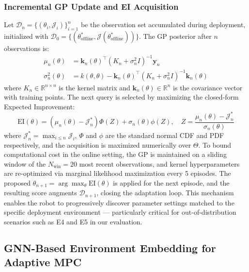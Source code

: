 \documentclass[conference]{IEEEtran}
\begin{document}
\subsubsection{Incremental GP Update and EI Acquisition}

Let $\mathcal{D}_n = \{(\theta_i, \mathcal{J}_i)\}_{i=1}^n$ be the observation set accumulated during deployment, initialized with $\mathcal{D}_0 = \{(\theta^*_{\text{offline}}, \mathcal{J}(\theta^*_{\text{offline}}))\}$. The GP posterior after $n$ observations is:
\begin{align}
	\mu_n(\theta)      & = \mathbf{k}_n(\theta)^\top (K_n + \sigma_n^2 I)^{-1} \mathbf{y}_n \label{eq:gp-mean}                           \\
	\sigma_n^2(\theta) & = k(\theta,\theta) - \mathbf{k}_n(\theta)^\top (K_n + \sigma_n^2 I)^{-1} \mathbf{k}_n(\theta) \label{eq:gp-var}
\end{align}
where $K_n \in \mathbb{R}^{n \times n}$ is the kernel matrix and $\mathbf{k}_n(\theta) \in \mathbb{R}^n$ is the covariance vector with training points. The next query is selected by maximizing the closed-form Expected Improvement:
\begin{equation}
	\text{EI}(\theta) = (\mu_n(\theta) - \mathcal{J}_n^*)\Phi(Z) + \sigma_n(\theta)\phi(Z), \quad Z = \frac{\mu_n(\theta) - \mathcal{J}_n^*}{\sigma_n(\theta)}
	\label{eq:ei}
\end{equation}
where $\mathcal{J}_n^* = \max_{i \le n}\mathcal{J}_i$, $\Phi$ and $\phi$ are the standard normal CDF and PDF respectively, and the acquisition is maximized numerically over $\Theta$. To bound computational cost in the online setting, the GP is maintained on a sliding window of the $N_{\text{win}} = 20$ most recent observations, and kernel hyperparameters are re-optimized via marginal likelihood maximization every 5 episodes. The proposed $\theta_{n+1} = \arg\max_\theta \text{EI}(\theta)$ is applied for the next episode, and the resulting score augments $\mathcal{D}_{n+1}$, closing the adaptation loop. This mechanism enables the robot to progressively discover parameter settings matched to the specific deployment environment — particularly critical for out-of-distribution scenarios such as E4 and E5 in our evaluation.

\subsection{GNN-Based Environment Embedding for Adaptive MPC}
\label{sec:gnn}
\end{document}
